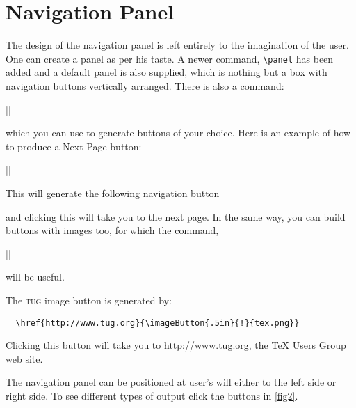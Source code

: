\documentclass[a4paper]{article}
\begin{document}
\section{Navigation Panel}
The design of the  navigation panel is left entirely to the imagination
of the user. One can create a panel as per his taste. A
newer command, \verb+\panel+ has been added and a default
panel is also supplied, which is nothing but a box with navigation
buttons vertically arranged. There is also a command:

\begin{decl}
  |\addButton|
\end{decl}
which you can use to generate buttons of your choice. Here is an
example of how to produce a Next Page button:
\begin{decl}
  ||
\end{decl}
This will generate the following navigation button
\begin{center}
\end{center}
and clicking this will take you to the next page. In the same way, you
can build buttons with images too, for which the command,
\begin{decl}
  |\imageButton|
\end{decl}
will be useful.
\begin{center}
\href{http://www.tug.org}{}
\end{center}

The \textsc{tug} image button is generated by:
\begin{verbatim}
  \href{http://www.tug.org}{\imageButton{.5in}{!}{tex.png}}
\end{verbatim}

Clicking this button will take you to \url{http://www.tug.org}, the
\TeX{} Users Group web site. 

The navigation panel can be positioned at user's will either to the
left side or right side. To see different types of output click the
buttons in \autoref{fig2}.
\end{document}
